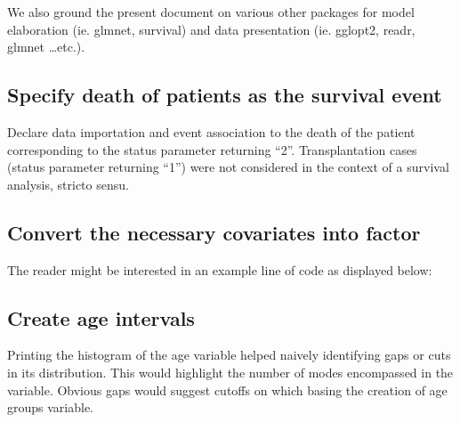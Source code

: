 \documentclass[]{article}
\newenvironment{Shaded}{\begin{snugshade}}{\end{snugshade}}
\newcommand{\KeywordTok}[1]{\textcolor[rgb]{0.13,0.29,0.53}{\textbf{#1}}}
\newcommand{\DecValTok}[1]{\textcolor[rgb]{0.00,0.00,0.81}{#1}}
\newcommand{\StringTok}[1]{\textcolor[rgb]{0.31,0.60,0.02}{#1}}
\newcommand{\CommentTok}[1]{\textcolor[rgb]{0.56,0.35,0.01}{\textit{#1}}}
\newcommand{\OperatorTok}[1]{\textcolor[rgb]{0.81,0.36,0.00}{\textbf{#1}}}
\newcommand{\NormalTok}[1]{#1}
\begin{document}
We also ground the present document on various other packages for model
elaboration (ie. glmnet, survival) and data presentation (ie. gglopt2,
readr, glmnet \ldots{}etc.).

\subsection{Specify death of patients as the survival
event}\label{specify-death-of-patients-as-the-survival-event}

Declare data importation and event association to the death of the
patient corresponding to the status parameter returning ``2''.
Transplantation cases (status parameter returning ``1'') were not
considered in the context of a survival analysis, stricto sensu.

\begin{Shaded}
\end{Shaded}

\subsection{Convert the necessary covariates into
factor}\label{convert-the-necessary-covariates-into-factor}

The reader might be interested in an example line of code as displayed
below:

\begin{Shaded}
\end{Shaded}

\subsection{Create age intervals}\label{create-age-intervals}

Printing the histogram of the age variable helped naively identifying
gaps or cuts in its distribution. This would highlight the number of
modes encompassed in the variable. Obvious gaps would suggest cutoffs on
which basing the creation of age groups variable.
\end{document}
